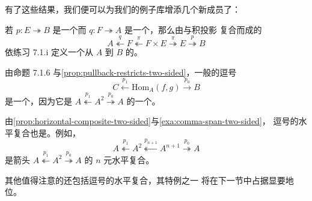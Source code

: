 有了这些结果，我们便可以为我们的例子库增添几个新成员了：

\begin{example}\label{exa:two-sided-fibration-from-cart-cocart}
若 $p\colon E\twoheadrightarrow B$ 是一个\trCartesianFibration{}而
$q\colon F\twoheadrightarrow A$ 是一个\trCocartesianFibration{}，那么由与积投影%
复合而成的\trSpan
\begin{equation*}
A\overset{q}{\twoheadleftarrow}F\overset{\pi}{\twoheadleftarrow}F\times E\overset{\pi}{\twoheadrightarrow}E\overset{p}{\twoheadrightarrow}B
\end{equation*}
依练习 7.1.i 定义一个从 $A$ 到 $B$ 的\trTwoSidedFibration{}。
\end{example}

\begin{example}\label{exa:comma-span-two-sided}
由命题 7.1.6 与\cref{prop:pullback-restricts-two-sided}，一般的逗号\trSpan
\begin{equation*}
C\xleftarrow{p_{1}}\mathrm{Hom}_{A}(f,g)\xrightarrow{p_{0}}B
\end{equation*}
是一个\trTwoSidedFibration{}，因为它是
$A\overset{p_{1}}{\twoheadleftarrow}A^{2}\overset{p_{0}}{\twoheadrightarrow}A$
的一个\trPullback{}。
\end{example}

\begin{example}\label{exa:horizontal-composite-comma-spans}
由\cref{prop:horizontal-composite-two-sided}与\cref{exa:comma-span-two-sided}，%
逗号\trSpan{}的水平复合也是\trTwoSidedFibration{}。例如，\trTwoSidedFibration
\begin{equation*}
A\overset{p_{1}}{\twoheadleftarrow}A^{2}
\overset{p_{n+1}}{\twoheadleftarrow}A^{n+1}
\overset{p_{0}}{\twoheadrightarrow}A
\end{equation*}
是箭头\trSpan{}
$A\overset{p_{1}}{\twoheadleftarrow}A^{2}\overset{p_{0}}{\twoheadrightarrow}A$
的 $n$ 元水平复合。
\end{example}

其他值得注意的\trTwoSidedFibration{}还包括逗号\trSpan{}的水平复合，其特例之一%
将在下一节中占据显要地位。
